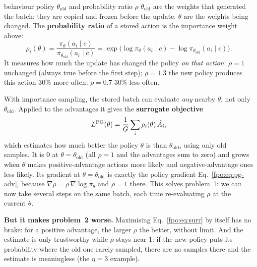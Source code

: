 \begin{newc}{behaviour policy $\theta_{\mathrm{old}}$ and probability ratio $\rho$}
$\theta_{\mathrm{old}}$ are the weights that generated the batch; they are copied and frozen before the update. $\theta$ are the weights being changed. The \textbf{probability ratio} of a stored action is the importance weight above:
\[\rho_i(\theta)=\frac{\pi_\theta(a_i\mid c)}{\pi_{\theta_{\mathrm{old}}}(a_i\mid c)}=\exp\big(\log\pi_\theta(a_i\mid c)-\log\pi_{\theta_{\mathrm{old}}}(a_i\mid c)\big).\]
It measures how much the update has changed the policy \emph{on that action}: $\rho=1$ unchanged (always true before the first step); $\rho=1.3$ the new policy produces this action 30\% more often; $\rho=0.7$ 30\% less often.
\end{newc}

With importance sampling, the stored batch can evaluate \emph{any} nearby $\theta$, not only $\theta_{\mathrm{old}}$. Applied to the advantages it gives the \textbf{surrogate objective}
\begin{equation}
L^{\mathrm{PG}}(\theta)=\frac1G\sum_i\rho_i(\theta)\,\hat A_i ,
\label{fpo:eq:surr}
\end{equation}
which estimates how much better the policy $\theta$ is than $\theta_{\mathrm{old}}$, using only old samples. It is $0$ at $\theta=\theta_{\mathrm{old}}$ (all $\rho=1$ and the advantages sum to zero) and grows when $\theta$ makes positive-advantage actions more likely and negative-advantage ones less likely. Its gradient at $\theta=\theta_{\mathrm{old}}$ is exactly the policy gradient Eq.~\eqref{fpo:eq:pg-adv}, because $\nabla\rho=\rho\,\nabla\log\pi_\theta$ and $\rho=1$ there. This solves problem~1: we can now take several steps on the same batch, each time re-evaluating $\rho$ at the current $\theta$.

\textbf{But it makes problem~2 worse.} Maximising Eq.~\eqref{fpo:eq:surr} by itself has no brake: for a positive advantage, the larger $\rho$ the better, without limit. And the estimate is only trustworthy while $\rho$ stays near $1$: if the new policy puts its probability where the old one rarely sampled, there are no samples there and the estimate is meaningless (the $\eta=3$ example).

